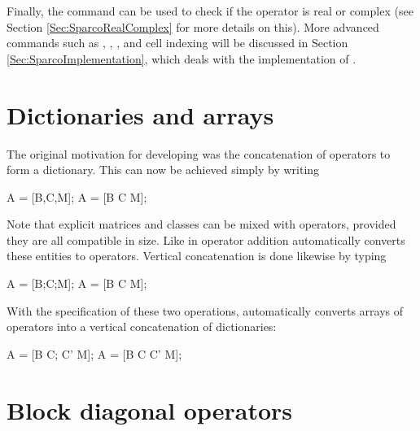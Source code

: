 Finally, the command  can be used to check if the
operator is real or complex (see Section \ref{Sec:SparcoRealComplex}
for more details on this).  More advanced commands such as
, , , and cell indexing will be
discussed in Section \ref{Sec:SparcoImplementation}, which deals with
the implementation of \spot{}.

\section{Dictionaries and arrays}

The original motivation for developing \sparco{} was the concatenation
of operators to form a dictionary. This can now be achieved simply by
writing 
\begin{codeblock}
A = [B,C,M]; %
A = [B C M];
\end{codeblock}
Note that explicit matrices and classes can be mixed with \sparco{}
operators, provided they are all compatible in size. Like in operator
addition \sparco{} automatically converts these entities to \sparco{}
operators. Vertical concatenation is done likewise by typing
\begin{codeblock}
A = [B;C;M]; %
A = [B
     C
     M];
\end{codeblock}
With the specification of these two operations, \matlab{} automatically
converts arrays of operators into a vertical concatenation of
dictionaries: 
\begin{codeblock}
A = [B C; C' M]; %
A = [B   C
     C'  M];     %
\end{codeblock}


\section{Block diagonal operators}

